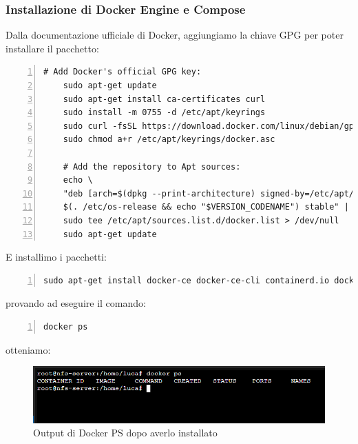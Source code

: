 \documentclass[a4paper]{article}
\begin{document}
\subsubsection{Installazione di Docker Engine e Compose}
Dalla documentazione ufficiale di Docker, aggiungiamo la chiave \Gls{GPG}
per poter installare il pacchetto:
\begin{Verbatim}[numbers=left,breaklines]
    # Add Docker's official GPG key:
    sudo apt-get update
    sudo apt-get install ca-certificates curl
    sudo install -m 0755 -d /etc/apt/keyrings
    sudo curl -fsSL https://download.docker.com/linux/debian/gpg -o /etc/apt/keyrings/docker.asc
    sudo chmod a+r /etc/apt/keyrings/docker.asc

    # Add the repository to Apt sources:
    echo \
    "deb [arch=$(dpkg --print-architecture) signed-by=/etc/apt/keyrings/docker.asc] https://download.docker.com/linux/debian \
    $(. /etc/os-release && echo "$VERSION_CODENAME") stable" | \
    sudo tee /etc/apt/sources.list.d/docker.list > /dev/null
    sudo apt-get update
\end{Verbatim}
E installimo i pacchetti:
\begin{Verbatim}[numbers=left,breaklines]
    sudo apt-get install docker-ce docker-ce-cli containerd.io docker-buildx-plugin docker-compose-plugin
\end{Verbatim}
provando ad eseguire il comando:
\begin{Verbatim}[numbers=left]
    docker ps
\end{Verbatim}
otteniamo:
\begin{figure}[H]
    \centering
    \includegraphics[scale=0.65]{images/DockerInstallato.png}
    \caption{Output di Docker PS dopo averlo installato}
\end{figure}
\end{document}
